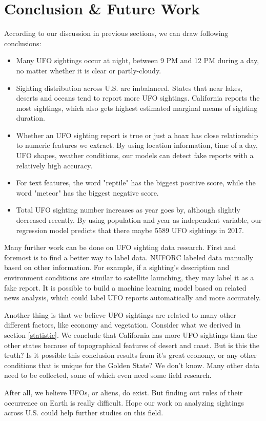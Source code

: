 \section{Conclusion \& Future Work}\label{conclusion}

According to our discussion in previous sections, we can draw following conclusions:

\begin{itemize}
    \item   Many UFO sightings occur at night, between 9 PM and 12 PM during a day, no matter whether it is clear or partly-cloudy. 
    \item   Sighting distribution across U.S. are imbalanced. States that near lakes, deserts and oceans tend to report more UFO sightings. California reports the most sightings, which also gets highest estimated marginal means of sighting duration.
    \item   Whether an UFO sighting report is true or just a hoax has close relationship to numeric features we extract. By using location information, time of a day, UFO shapes, weather conditions, our models can detect fake reports with a relatively high accuracy.
    \item   For text features, the word "reptile" has the biggest positive score, while the word "meteor" has the biggest negative score. 
    \item   Total UFO sighting number increases as year goes by, although slightly decreased recently. By using population and year as independent variable, our regression model predicts that there maybe 5589 UFO sightings in 2017.
\end{itemize}

Many further work can be done on UFO sighting data research. First and foremost is to find a better way to label data. NUFORC labeled data manually based on other information. For example, if a sighting's description and environment conditions are similar to satellite launching, they may label it as a fake report. It is possible to build a machine learning model based on related news analysis, which could label UFO reports automatically and more accurately.

Another thing is that we believe UFO sightings are related to many other different factors, like economy and vegetation. Consider what we derived in section \ref{statistic}. We conclude that California has more UFO sightings than the other states because of topographical features of desert and coast. But is this the truth? Is it possible this conclusion results from it's great economy, or any other conditions that is unique for the Golden State? We don't know. Many other data need to be collected, some of which even need some field research. 

After all, we believe UFOs, or aliens, do exist. But finding out rules of their occurrence on Earth is really difficult. Hope our work on analyzing sightings across U.S. could help further studies on this field.




